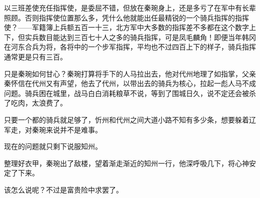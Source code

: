 以三班差使充任指挥使，是委屈不错，但放在秦琬身上，还是多亏了在军中有长辈照顾。否则指挥使位置那么多，凭什么他就能出任最精锐的一个骑兵指挥的指挥使？——军籍簿上兵额五百一十三，北方军中大多数的指挥差不多都在这个数字上下，但实兵数目能达到三百七十人之多的骑兵指挥，可是凤毛麟角！即便当年韩冈在河东合兵为将，各将中的一个步军指挥，平均也不过四百上下的样子，骑兵指挥通常更是只有三百。

只是秦琬如何甘心？秦琬打算将手下的人马拉出去，他对代州地理了如指掌，父亲秦怀信在代州又有声望，他去了代州，以带出去的骑兵为核心，拉起一彪人马不成问题。骑兵困在城里，战马白白消耗粮草不说，等到了围城日久，说不定还会被杀了吃肉，太浪费了。

只要一个都的骑兵就足够了，忻州和代州之间大道小路不知有多少条，想要躲着辽军走，对秦琬来说并不是难事。

现在的问题就只剩下说服知州。

整理好衣甲，秦琬出了敌楼，望着渐走渐近的知州一行，他深呼吸几下，将心神安定了下来。

该怎么说呢？不过是富贵险中求罢了。

